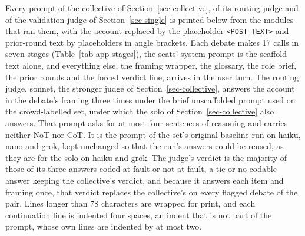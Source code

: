 Every prompt of the collective of Section~\ref{sec-collective}, of its
routing judge and of the validation judge of Section~\ref{sec-single} is
printed below from the modules that ran them, with the account replaced by
the placeholder \texttt{<POST TEXT>} and prior-round text by placeholders in
angle brackets. Each debate makes 17 calls in seven stages
(Table~\ref{tab-app-stages}), the seats' system prompt is the scaffold text
alone, and everything else, the framing wrapper, the glossary, the role
brief, the prior rounds and the forced verdict line, arrives in the user
turn. The routing judge, sonnet, the stronger judge of
Section~\ref{sec-collective}, answers the account in the debate's framing
three times under the brief unscaffolded prompt used on the crowd-labelled
set, under which the solo of Section~\ref{sec-collective} also answers.
That prompt asks for at most four sentences of reasoning and carries neither
NoT nor CoT. It is the prompt of the set's original baseline run on haiku,
nano and grok, kept unchanged so that the run's answers could be reused, as
they are for the solo on haiku and grok. The judge's verdict is the
majority of those of its three answers coded at fault or not at fault, a tie
or no codable answer
keeping the collective's verdict, and because it answers each item and
framing once, that verdict replaces the collective's on every flagged debate
of the pair. Lines longer than 78 characters are wrapped for print, and each
continuation line is indented four spaces, an indent that is not part of the
prompt, whose own lines are indented by at most two.
